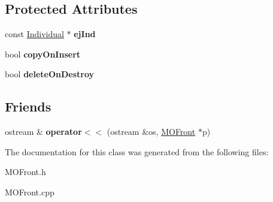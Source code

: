 \subsection*{Protected Attributes}
\begin{DoxyCompactItemize}
\item 
\mbox{\label{classMOFront_a269600b355bba124d6210c7802090282}} 
const \mbox{\hyperlink{classIndividual}{Individual}} $\ast$ {\bfseries ej\+Ind}
\item 
\mbox{\label{classMOFront_aace714da7364fe832e34d202c1a833dc}} 
bool {\bfseries copy\+On\+Insert}
\item 
\mbox{\label{classMOFront_a2be8b146cfc5bff6bae00c9d33e2c172}} 
bool {\bfseries delete\+On\+Destroy}
\end{DoxyCompactItemize}
\subsection*{Friends}
\begin{DoxyCompactItemize}
\item 
\mbox{\label{classMOFront_a186acbb3ce54aa4fdb3b08ea1d9fff18}} 
ostream \& {\bfseries operator$<$$<$} (ostream \&os, \mbox{\hyperlink{classMOFront}{M\+O\+Front}} $\ast$p)
\end{DoxyCompactItemize}


The documentation for this class was generated from the following files\+:\begin{DoxyCompactItemize}
\item 
M\+O\+Front.\+h\item 
M\+O\+Front.\+cpp\end{DoxyCompactItemize}
